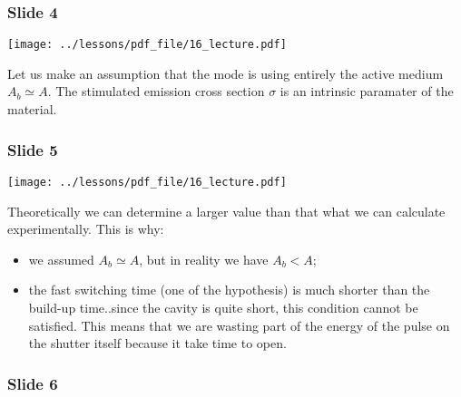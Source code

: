 \documentclass[../main/main.tex]{subfiles}
\begin{document}
\newpage

\subsubsection*{Slide 4}

\begin{minipage}[]{0.5\linewidth}
\centering
\texttt{[image: ../lessons/pdf\_file/16\_lecture.pdf]}
\end{minipage}
\hspace{0.3cm}\vspace{0.3cm}
\begin{minipage}[c]{0.47\linewidth}

Let us make an assumption that the mode is using entirely the active medium \( A_b \simeq A \). The stimulated emission cross section \( \sigma  \) is an intrinsic paramater of the material.

\end{minipage}

\subsubsection*{Slide 5}

\begin{minipage}[]{0.5\linewidth}
\centering
\texttt{[image: ../lessons/pdf\_file/16\_lecture.pdf]}
\end{minipage}
\hspace{0.3cm}\vspace{0.3cm}
\begin{minipage}[c]{0.47\linewidth}

Theoretically we can determine a larger value than that what we can calculate experimentally. This is why:
\begin{itemize}
\item we assumed \( A_b \simeq A \), but in reality we have \( A_b < A \);
\item the fast switching time (one of the hypothesis) is much shorter than the build-up time..since the cavity is quite short, this condition cannot be satisfied. This means that we are wasting part of the energy of the pulse on the shutter itself because it take time to open.
\end{itemize}

\end{minipage}

\subsubsection*{Slide 6}
\end{document}

